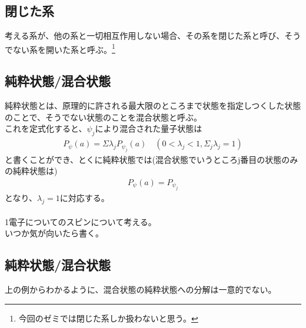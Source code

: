 \documentclass[a4paper,11pt]{jsarticle}
\begin{document}
\subsection{閉じた系}
考える系が、他の系と一切相互作用しない場合、その系を閉じた系と呼び、そうでない系を開いた系と呼ぶ。\footnote{今回のゼミでは閉じた系しか扱わないと思う。}\\
\subsection{純粋状態/混合状態}
純粋状態とは、原理的に許される最大限のところまで状態を指定しつくした状態のことで、そうでない状態のことを混合状態と呼ぶ。\\
これを定式化すると、$\psi _j$により混合された量子状態は
\begin{align}
P_{\psi}(a)=\Sigma \lambda _j P_{\psi _j}(a)\quad (0<\lambda _j <1,\Sigma_j \lambda _j=1)
\end{align}
と書くことができ、とくに純粋状態では(混合状態でいうところj番目の状態のみの純粋状態は)
\begin{align}
P_{\psi}(a)= P_{\psi _j}
\end{align}
となり、$\lambda_j =1$に対応する。\\

\\
1電子についてのスピンについて考える。\\
いつか気が向いたら書く。
\subsection{純粋状態/混合状態}
上の例からわかるように、混合状態の純粋状態への分解は一意的でない。
\end{document}
